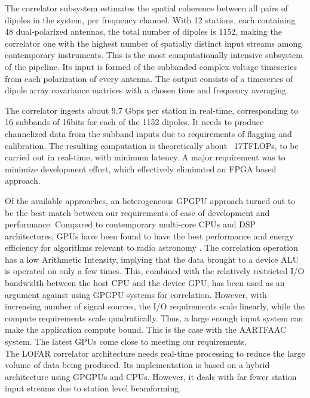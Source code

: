 \documentclass{ws-jai}
\begin{document}
The correlator  subsystem estimates the  spatial coherence between all  pairs of
dipoles in the system, per frequency  channel. With 12 stations, each containing
48 dual-polarized  antennas, the  total number  of dipoles  is 1152,  making the
correlator one with the highest number of spatially distinct input streams among
contemporary instruments.  This is  the most computationally intensive subsystem
of  the  pipeline.   Its  input  is formed  of  the  subbanded  complex  voltage
timeseries from  each polarization of every  antenna.  The output consists  of a
timeseries of dipole array covariance matrices  with a chosen time and frequency
averaging.

The correlator ingests about 9.7 Gbps per station in real-time, corresponding to
16  subbands of  16bits for  each  of the  1152  dipoles.  It  needs to  produce
channelized data  from the subband  inputs due  to requirements of  flagging and
calibration. The resulting  computation is theoretically about  ~17TFLOPs, to be
carried out  in real-time,  with minimum  latency.  A  major requirement  was to
minimize  development  effort,  which   effectively  eliminated  an  FPGA  based
approach.

Of the available approaches, an heterogeneous GPGPU approach turned out to be the
best  match between  our requirements  of ease  of development  and performance.
Compared to contemporary  multi-core CPUs and DSP architectures,  GPUs have been
found to have the best performance and energy efficiency for algorithms relevant
to radio astronomy \cite{romein2016comparison}.  The correlation operation has a
low Arithmetic  Intensity, implying  that the  data brought to  a device  ALU is
operated on only a few times.  This, combined with the relatively restricted I/O
bandwidth between the host CPU and the  device GPU, has been used as an argument
against using GPGPU systems for  correlation. However, with increasing number of
signal  sources,  the  I/O  requirements   scale  linearly,  while  the  compute
requirements scale quadratically. Thus, a large enough input system can make the
application compute bound. This is the  case with the AARTFAAC system. The latest
GPUs come close to meeting our requirements.\\ The LOFAR correlator architecture
needs real-time  processing to reduce the  large volume of data  being produced.
Its implementation  is based  on a  hybrid architecture  using GPGPUs  and CPUs.
However, it  deals with  far fewer  station input streams  due to  station level
beamforming.
\end{document}

